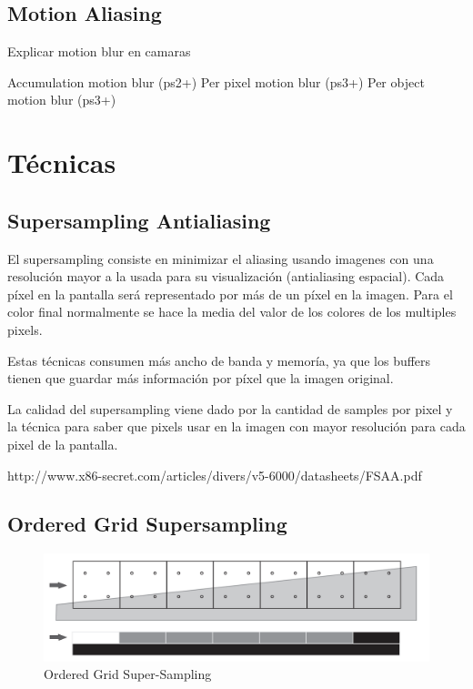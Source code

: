 \documentclass[withindex, glossary]{cam-thesis}
\begin{document}
\section{Motion Aliasing}
Explicar motion blur en camaras

Accumulation motion blur (ps2+)
Per pixel motion blur (ps3+)
Per object motion blur (ps3+)

\chapter{Técnicas}

\section{Supersampling Antialiasing}

El supersampling consiste en minimizar el aliasing usando imagenes con una resolución mayor a la usada para su visualización (antialiasing espacial). Cada píxel en la pantalla será representado por más de un píxel en la imagen. Para el color final normalmente se hace la media del valor de los colores de los multiples pixels.

Estas técnicas consumen más ancho de banda y memoría, ya que los buffers tienen que guardar más información por píxel que la imagen original.

La calidad del supersampling viene dado por la cantidad de samples por pixel y la técnica para saber que pixels usar en la imagen con mayor resolución para cada pixel de la pantalla.

http://www.x86-secret.com/articles/divers/v5-6000/datasheets/FSAA.pdf

\section{Ordered Grid Supersampling}

\begin{figure}
    \includegraphics[width=\linewidth]{figures/ogss.png}
    \caption{Ordered Grid Super-Sampling\cite{Beets2000SupersamplingAA}}
    \label{fig:ogss}
\end{figure}
\end{document}

